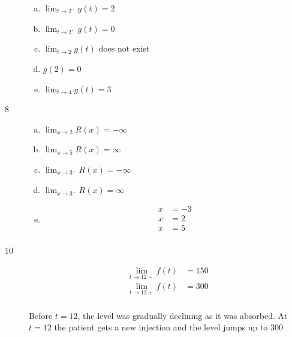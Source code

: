 \documentclass[letterpaper]{exam}
\begin{document}
\begin{description}
\begin{enumerate}[(a)]
          \item $\lim_{t \to 2^-} g(t) = 2$
          \item $\lim_{t \to 2^+} g(t) = 0$
          \item $\lim_{t \to 2} g(t)$ does not exist
          \item $g(2) = 0$

          \item $\lim_{t \to 4} g(t) = 3$
        \end{enumerate}

      \item[8]
        \begin{enumerate}[(a)]
          \item $\lim_{x \to 2} R(x) = -\infty$
          \item $\lim_{x \to 5} R(x) = \infty$
          \item $\lim_{x \to 3^-} R(x) = -\infty$
          \item $\lim_{x \to 3^+} R(x) = \infty$

          \item
            \begin{align*}
              x & = -3 \\
              x & = 2 \\
              x & = 5 \\
            \end{align*}

        \end{enumerate}

      \item[10]
        \begin{align*}
          \lim_{t \to 12-} f(t) &= 150 \\
          \lim_{t \to 12+} f(t) &= 300 \\
        \end{align*}

        Before $t = 12$, the level was gradually declining as it was absorbed.
        At $t = 12$ the patient gets a new injection and the level jumps up to 300




\end{description}
\end{document}
